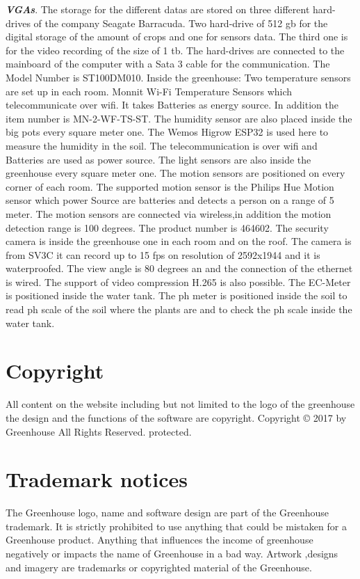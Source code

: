 \textbf{\emph{\glspl{VGA}}}. \hfill \break\break
The storage for the different datas are stored on three different hard-drives of
the company Seagate Barracuda. Two hard-drive of 512 gb for the digital storage
of the amount of crops and one for sensors data. The third one is for the video
recording of the size of 1 tb. The hard-drives are connected to the mainboard of
the computer with a Sata 3 cable for the communication. The Model Number is
ST100DM010.\hfill \break\break
Inside the greenhouse:\hfill \break\break
Two temperature sensors are set up in each room. Monnit Wi-Fi Temperature
Sensors which telecommunicate over wifi. It takes Batteries as energy
source. In addition the item number is MN-2-WF-TS-ST.\hfill \break\break
The humidity sensor are also placed inside the big pots every square meter one. 
The Wemos Higrow ESP32 is used here to measure the humidity in the soil. The
telecommunication is over wifi and Batteries are used as power source.\hfill
\break\break
The light sensors are also inside the greenhouse every square meter one.\hfill
\break\break
The motion sensors are positioned on every corner of each room. The supported
motion sensor is the Philips Hue Motion sensor which power Source are batteries
and detects a person on a range of 5 meter. The motion sensors are connected via
wireless,in addition the motion detection range is 100 degrees. The product
number is 464602.\hfill \break\break
The security camera is inside the greenhouse one in each room and on the roof.
The camera is from SV3C it can record up to 15 fps on resolution of 2592x1944
and it is waterproofed. The view angle is 80 degrees an and the connection of
the ethernet is wired. The support of video compression H.265 is also
possible.\hfill \break\break
The EC-Meter is positioned inside the water tank.\hfill \break\break
The ph meter is positioned inside the soil to read ph scale of the soil where
the plants are and to check the ph scale inside the water tank.\hfill
\break\break



\section{Copyright}
All content on the website including but not limited to  the logo of the
greenhouse the design  and the functions of the software are copyright.
Copyright © 2017 by Greenhouse All Rights Reserved. protected.

\section{Trademark notices}
The Greenhouse logo, name and software design are part of the Greenhouse
trademark. It is strictly prohibited to use anything that could be mistaken for
a Greenhouse product. Anything that influences the income of greenhouse
negatively or impacts the name of Greenhouse in a bad way. Artwork ,designs and
imagery are trademarks or copyrighted material of the Greenhouse.


